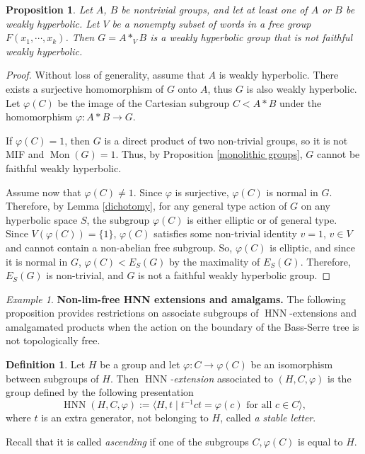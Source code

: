 \documentclass[11pt,letterpaper]{article}
\renewcommand{\phi}{\varphi}
\DeclareMathOperator{\Mon}{Mon}
\DeclareMathOperator{\HNN}{HNN}
\newtheorem{prop}[thm]{Proposition}
\theoremstyle{definition}
\newtheorem{defn}[thm]{Definition}
\theoremstyle{remark}
\newtheorem{ex}[thm]{Example}
\begin{document}
\begin{prop}\label{WH not FWH groups}
Let $A$, $B$ be nontrivial groups, and let at least one of $A$ or $B$ be weakly hyperbolic. Let $V$ be a nonempty subset of words in a free group $F(x_1, \cdots, x_k)$. Then $G=A *_V B$ is a weakly hyperbolic group that is not faithful weakly hyperbolic.
\end{prop}
\begin{proof}
Without loss of generality, assume that $A$ is weakly hyperbolic. There exists a surjective homomorphism of $G$ onto $A$, thus $G$ is also weakly hyperbolic. Let $\phi(C)$ be the image of the Cartesian subgroup $C < A*B$ under the homomorphism $\phi \colon A*B \rightarrow G$.

If $\phi(C)=1$, then $G$ is a direct product of two non-trivial groups, so it is not MIF and $\Mon(G)=1$. Thus, by Proposition \ref{monolithic groups}, $G$ cannot be faithful weakly hyperbolic. 

Assume now that $\phi(C) \neq 1$. Since $\phi$ is surjective, $\phi(C)$ is normal in $G$. Therefore, by Lemma \ref{dichotomy}, for any general type action of $G$ on any hyperbolic space $S$, the subgroup $\phi(C)$ is either elliptic or of general type. Since $V(\phi(C))=\{1\}$, $\phi(C)$ satisfies some non-trivial identity $v=1$, $v \in V$ and cannot contain a non-abelian free subgroup. So, $\phi(C)$ is elliptic, and since it is normal in $G$, $\phi(C) < E_S(G)$ by the maximality of $E_S(G)$. Therefore, $E_S(G)$ is non-trivial, and $G$ is not a faithful weakly hyperbolic group. 
\end{proof}


\begin{ex}{\bf Non-lim-free HNN extensions and amalgams.} The following proposition provides restrictions on associate subgroups of $\HNN$-extensions and amalgamated products when the action on the boundary of the Bass-Serre tree is not topologically free.
\end{ex}

\begin{defn}
Let $H$ be a group and let $\phi \colon C \rightarrow \phi(C)$ be an isomorphism between subgroups of $H$. Then {\it $\HNN$-extension} associated to $(H, C, \phi)$ is the group defined by the following presentation
$$
\HNN(H, C, \phi):=\langle H, t \mid t^{-1}ct=\phi(c) \text{ for all } c \in C \rangle,
$$
where $t$ is an extra generator, not belonging to $H$, called {\it a stable letter}.
\end{defn}
Recall that it is called {\it ascending} if one of the subgroups $C, \phi(C)$ is equal to $H$.
\end{document}
